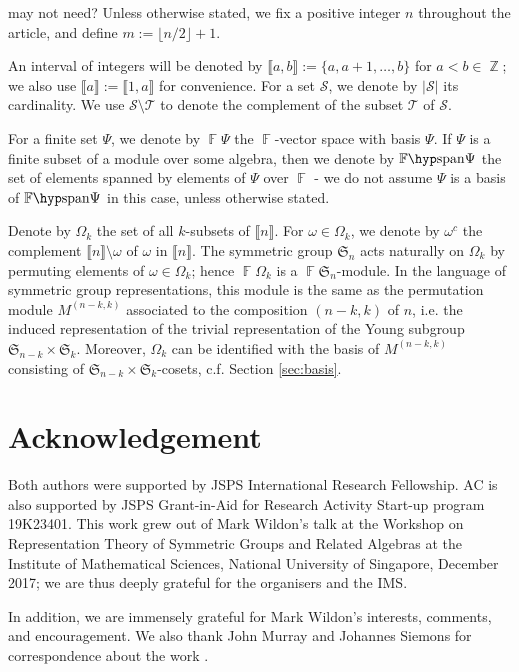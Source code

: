\documentclass[a4paper]{amsart}
\numberwithin{equation}{subsection}
\theoremstyle{definition}
\DeclareMathOperator{\F}{\mathbb{F}}
\DeclareMathOperator{\Z}{\mathbb{Z}}
\newcommand{\interval}[1]{\llbracket #1 \rrbracket}
\newcommand{\comm}[1]{{\color{red}#1}}
\newcommand{\old}[1]{{\color{green}#1}}
\newcommand{\Fspan}{\mathbb{F}\hyp\mathrm{span}}
\numberwithin{equation}{subsection}
\begin{document}
\comm{may not need?}
\old{Unless otherwise stated, we fix a positive integer $n$ throughout the article, and define $m:=\lfloor n/2 \rfloor+1$.}

An interval of integers will be denoted by $\interval{a,b}:=\{a,a+1,\ldots,b\}$ for $a<b\in\Z$; we also use $\interval{a}:=\interval{1,a}$ for convenience.
For a set $\mathcal{S}$, we denote by $|\mathcal{S}|$ its cardinality.
We use $\mathcal{S}\setminus \mathcal{T}$ to denote the complement of the subset $\mathcal{T}$ of $\mathcal{S}$.	

For a finite set $\Psi$, we denote by $\F\Psi$ the $\F$-vector space with basis $\Psi$.
If $\Psi$ is a finite subset of a module over some algebra, then we denote by $\Fspan\Psi$ the set of elements spanned by elements of $\Psi$ over $\F$ - we do not assume $\Psi$ is a basis of $\Fspan\Psi$ in this case, unless otherwise stated.

Denote by $\Omega_k$ the set of all $k$-subsets of $\interval{n}$.
For $\omega\in\Omega_k$, we denote by $\omega^c$ the complement $\interval{n}\setminus \omega$ of $\omega$ in $\interval{n}$.  The symmetric group $\mathfrak{S}_n$ acts naturally on $\Omega_k$ by permuting elements of $\omega\in \Omega_k$; hence $\F\Omega_k$ is a $\F\mathfrak{S}_n$-module.  In the language of symmetric group representations, this module is the same as the permutation module $M^{(n-k,k)}$ associated to the composition $(n-k,k)$ of $n$, i.e. the induced representation of the trivial representation of the Young subgroup $\mathfrak{S}_{n-k}\times\mathfrak{S}_k$.  Moreover, $\Omega_k$ can be identified with the basis of $M^{(n-k,k)}$ consisting of $\mathfrak{S}_{n-k}\times\mathfrak{S}_k$-cosets, c.f.  Section \ref{sec:basis}.

\section*{Acknowledgement}
Both authors were supported by JSPS International Research Fellowship.  AC is also supported by JSPS Grant-in-Aid for Research Activity Start-up program 19K23401.
This work grew out of Mark Wildon's talk at the Workshop on Representation Theory of Symmetric Groups and Related Algebras at the Institute of Mathematical Sciences, National University of Singapore, December 2017; we are thus deeply grateful for the organisers and the IMS.  

In addition, we are immensely grateful for Mark Wildon's interests, comments, and encouragement.  We also thank John Murray and Johannes Siemons for correspondence about the work \cite{BJS}.
\end{document}
